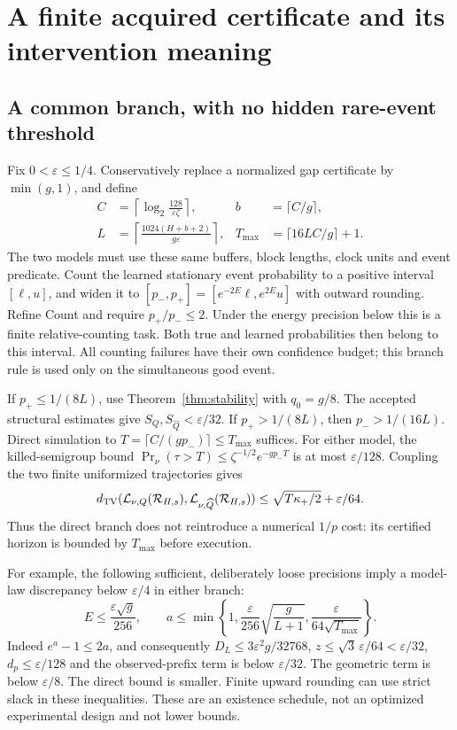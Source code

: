 \section{A finite acquired certificate and its intervention meaning}
\label{sec:acquired}

\subsection{A common branch, with no hidden rare-event threshold}
Fix $0<\varepsilon\le1/4$. Conservatively replace a normalized gap
certificate by $\min(g,1)$, and define
\begin{align}
C&=\left\lceil\log_2\frac{128}{\varepsilon\zeta}\right\rceil,
&b&=\lceil C/g\rceil,\\
L&=\left\lceil\frac{1024(H+b+2)}{g\varepsilon}\right\rceil,
&T_{\max}&=\lceil16LC/g\rceil+1.
\label{eq:commonSchedule}
\end{align}
The two models must use these same buffers, block lengths, clock units
and event predicate. Count the learned stationary event probability to a
positive interval $[\ell,u]$, and widen it to
$[p_-,p_+]=[e^{-2E}\ell,e^{2E}u]$ with outward rounding. Refine Count
and require $p_+/p_-\le2$. Under the energy precision below this is a
finite relative-counting task. Both true and learned probabilities then
belong to this interval. All counting failures have their own confidence
budget; this branch rule is used only on the simultaneous good event.

If $p_+\le1/(8L)$, use Theorem~\ref{thm:stability} with $q_0=g/8$.
The accepted structural estimates give $S_Q,S_{\widehat Q}<\varepsilon/32$.
If $p_+>1/(8L)$, then $p_->1/(16L)$. Direct simulation to
$T=\lceil C/(gp_-)\rceil\le T_{\max}$ suffices. For either model,
the killed-semigroup bound
$\Pr_\nu(\tau>T)\le\zeta^{-1/2}e^{-gp_-T}$ is at most
$\varepsilon/128$. Coupling the two finite uniformized trajectories gives
\begin{equation}
d_{\rm TV}(\mathcal L_{\nu,Q}(\mathcal R_{H,s}),
        \mathcal L_{\nu,\widehat Q}(\mathcal R_{H,s}))
\le\sqrt{T\kappa_+/2}+\varepsilon/64.
\label{eq:directStability}
\end{equation}
Thus the direct branch does not reintroduce a numerical $1/p$ cost:
its certified horizon is bounded by $T_{\max}$ before execution.

For example, the following sufficient, deliberately loose precisions
imply a model-law discrepancy below $\varepsilon/4$ in either branch:
\begin{equation}
E\le\frac{\varepsilon\sqrt g}{256},\qquad
a\le\min\left\{1,
\frac{\varepsilon}{256}\sqrt{\frac g{L+1}},
\frac{\varepsilon}{64\sqrt{T_{\max}}}\right\}.
\label{eq:sufficientprecision}
\end{equation}
Indeed $e^a-1\le2a$, and consequently
$D_L\le3\varepsilon^2g/32768$,
$z\le\sqrt3\,\varepsilon/64<\varepsilon/32$,
$d_p\le\varepsilon/128$ and the observed-prefix term is below
$\varepsilon/32$. The geometric term is below $\varepsilon/8$.
The direct bound is smaller. Finite upward rounding can use strict
slack in these inequalities. These are an existence schedule, not an
optimized experimental design and not lower bounds.

